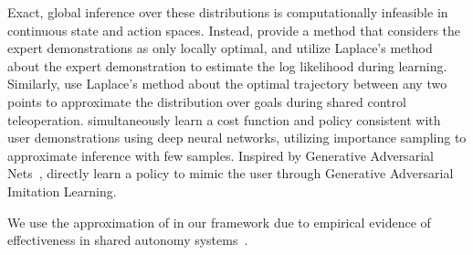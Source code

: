 Exact, global inference over these distributions is computationally infeasible in continuous state and action spaces. Instead, \citet{levine_2012} provide a method that considers the expert demonstrations as only locally optimal, and utilize Laplace's method about the expert demonstration to estimate the log likelihood during learning. Similarly, \citet{dragan_2013_assistive} use Laplace's method about the optimal trajectory between any two points to approximate the distribution over goals during shared control teleoperation. \citet{finn_2016} simultaneously learn a cost function and policy consistent with user demonstrations using deep neural networks, utilizing importance sampling to approximate inference with few samples. Inspired by Generative Adversarial Nets~\citep{goodfellow_2014}, \citet{ho_2016} directly learn a policy to mimic the user through Generative Adversarial Imitation Learning.

We use the approximation of \citet{dragan_2013_assistive} in our framework due to empirical evidence of effectiveness in shared autonomy systems~\citep{dragan_2013_assistive, muelling_2015}. 


